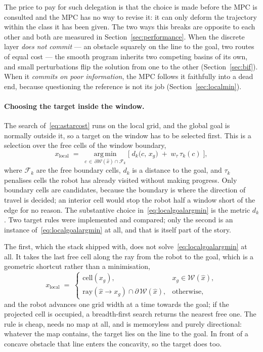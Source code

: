\documentclass[11pt,a4paper]{article}
\begin{document}
The price to pay for such delegation is that the choice is made before the MPC is consulted and the MPC has no way to
revise it: it can only deform the trajectory within the class it has been given. The two ways this breaks
are opposite to each other and both are measured in Section~\ref{sec:performance}. When the discrete layer
\emph{does not commit} --- an obstacle squarely on the line to the goal, two routes of equal cost --- the
smooth program inherits two competing basins of its own, and small perturbations flip the solution from one
to the other (Section~\ref{sec:bif}). When it \emph{commits on poor information}, the MPC follows it
faithfully into a dead end, because questioning the reference is not its job
(Section~\ref{sec:localmin}).

\paragraph{Choosing the target inside the window.} The search of~\eqref{eq:astarcost} runs on the local
grid, and the global goal is normally outside it, so a target on the window has to be selected first. This
is a selection over the free cells of the window boundary,
\begin{equation}
  x_{\mathrm{local}} \;=\;
  \operatorname*{arg\,min}_{c\,\in\,\partial\mathcal{W}(\hat x)\cap\mathcal{F}_k}
  \Big[\; d_k\big(c,\,x_g\big) \;+\; w_\tau\,\tau_k(c) \;\Big],
  \label{eq:localgoalargmin}
\end{equation}
where $\mathcal{F}_k$ are the free boundary cells, $d_k$ is a distance to the goal, and $\tau_k$ penalises
cells the robot has already visited without making progress. Only boundary cells are candidates, because
the boundary is where the direction of travel is decided; an interior cell would stop the robot half a
window short of the edge for no reason. The substantive choice in~\eqref{eq:localgoalargmin} is the metric
$d_k$. Two target rules were implemented and compared; only the second is an instance
of~\eqref{eq:localgoalargmin} at all, and that is itself part of the story.

The first, which the stack shipped with, does not solve~\eqref{eq:localgoalargmin} at all. It takes the
last free cell along the ray from the robot to the goal, which is a geometric shortcut rather than a
minimisation,
\begin{equation}
  x_{\mathrm{local}} \;=\;
  \begin{cases}
    \mathrm{cell}(x_g), & x_g\in\mathcal{W}(\hat x),\\[2pt]
    \mathrm{ray}(\hat x\!\rightarrow\! x_g)\cap\partial\,\mathcal{W}(\hat x), & \text{otherwise},
  \end{cases}
  \label{eq:localgoal}
\end{equation}
and the robot advances one grid width at a time towards the goal; if the projected cell is occupied, a
breadth-first search returns the nearest free one. The rule is cheap, needs no map at all, and is
memoryless and purely directional: whatever the map contains, the target lies on the line to the goal.
In front of a concave obstacle that line enters the concavity, so the target does too.
\end{document}
